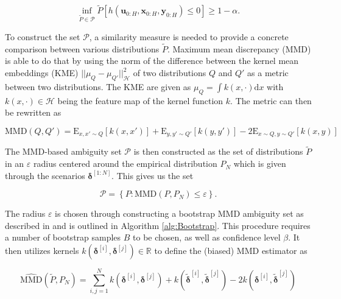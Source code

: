 \begin{equation} \label{wc constraints}
\inf\limits_{\tilde{P} \in \mathcal{P}}\tilde{P} \left[ h(\boldsymbol{u}_{0:H},  \boldsymbol{x}_{0:H},  \boldsymbol{y}_{0:H}) \leq 0 \right] \geq 1 - \alpha.
\end{equation}

To construct the set $\mathcal{P}$, a similarity measure is needed to provide a concrete comparison between various distributions $\tilde{P}$. Maximum mean discrepancy (MMD) \cite{Arthur_12} is able to do that by using the norm of the difference between the kernel mean embeddings (KME) $|| \mu_Q - \mu_{Q'} ||^2_{\mathcal{H}}$ of two distributions $Q$ and $Q'$ as a metric between two distributions. The KME are given as $\mu_Q = \int k(x, \cdot) \text{d}x$ with $k(x, \cdot) \in \mathcal{H}$ being the feature map of the kernel function $k$. The metric can then be rewritten as 

\begin{equation} \label{MMD Kernel}
\text{MMD}(Q, Q') = \text{E}_{x,x' \sim Q}[k(x,x')] + \text{E}_{y,y' \sim Q'}[k(y,y')] - 2\text{E}_{x\sim Q, y \sim Q'}[k(x,y)]
\end{equation}

The MMD-based ambiguity set $\mathcal{P}$ is then constructed as the set of distributions $\tilde{P}$ in an $\varepsilon$ radius centered around the empirical distribution $P_N$ which is given through the scenarios $\boldsymbol{\delta}^{[1:N]}$. This gives us the set

\begin{equation} \label{ambiguity set}
\mathcal{P} =  \left\{ P : \text{MMD} (P, P_N) \leq \varepsilon \right\}.
\end{equation}

The radius $\varepsilon$ is chosen through constructing a bootstrap MMD ambiguity set as described in \cite{Yassine_22} and is outlined in Algorithm \ref{alg:Bootstrap}. This procedure requires a number of bootstrap samples $B$ to be chosen, as well as confidence level $\beta$. It then utilizes kernels $k(\boldsymbol{\delta}^{[i]}, \boldsymbol{\delta}^{[j]}) \in \mathbb{R}$ to define the (biased) MMD estimator as 

\begin{equation} \label{ambiguity set approx}
\widehat{\text{MMD}} (\tilde{P}, P_N) = \sum_{i,j = 1}^N k(\boldsymbol{\delta}^{[i]}, \boldsymbol{\delta}^{[j]}) + k(\tilde{\boldsymbol{\delta}}^{[i]}, \tilde{\boldsymbol{\delta}}^{[j]}) - 2 k(\boldsymbol{\delta}^{[i]}, \tilde{\boldsymbol{\delta}}^{[j]})
\end{equation}

